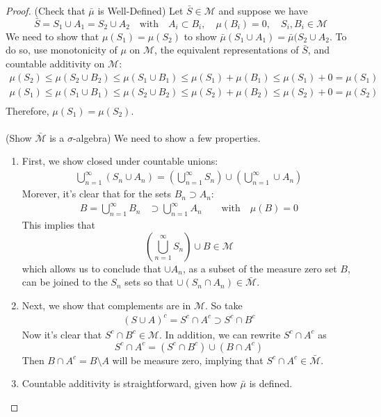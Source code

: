 \documentclass[12pt]{article}
\theoremstyle{plain}
\theoremstyle{definition}
\theoremstyle{remark}
\begin{document}
\begin{proof}
(Check that $\bar{\mu}$ is Well-Defined) Let $\bar{S}\in\mathscr{M}$ and suppose we have
\[
    \bar{S} = S_1 \cup A_1 = S_2 \cup A_2 
    \quad\text{with}\quad
    A_i \subset B_i, \quad \mu(B_i) = 0, 
    \quad S_i, B_i \in \mathscr{M}
\]
We need to show that $\mu(S_1) = \mu(S_2)$ to show $\bar{\mu}(S_1\cup
A_1) = \bar{\mu}(S_2\cup A_2$. To do so, use monotonicity of $\mu$ on
$\mathscr{M}$, the equivalent representations of $\bar{S}$, and
countable additivity on $\mathscr{M}$:
\begin{align*}
    \mu(S_2) \leq \mu(S_2 \cup B_2) \leq 
        \mu(S_1 \cup B_1) \leq \mu(S_1) + \mu(B_1)
        \leq \mu(S_1) + 0 = \mu(S_1)  \\
    \mu(S_1) \leq \mu(S_1 \cup B_1) \leq 
        \mu(S_2 \cup B_2) \leq \mu(S_2) + \mu(B_2)
        \leq \mu(S_2) + 0 = \mu(S_2)  \\
\end{align*}
Therefore, $\mu(S_1) = \mu(S_2)$.
\\
\\
(Show $\bar{\mathscr{M}}$ is a $\sigma$-algebra) We need to show a few properties.
\begin{enumerate}
\item
First, we show closed under countable unions:
\begin{align*}
    \bigcup^\infty_{n=1} (S_n\cup A_n) = 
    \left(\bigcup^\infty_{n=1} S_n\right)
    \cup \left(\bigcup^\infty_{n=1}\cup A_n\right)
\end{align*}
Morever, it's clear that for the sets $B_n \supset A_n$:
\begin{align*}
    B = \bigcup^\infty_{n=1} B_n &\supset 
    \bigcup^\infty_{n=1} A_n 
    \qquad \text{with} \quad \mu(B) = 0
\end{align*}
This implies that
\[
    \left(\bigcup^\infty_{n=1} S_n\right) \cup B \in 
    {\mathscr{M}} 
\]
which allows us to conclude that $\cup A_n$, as a subset of the measure
zero set $B$, can be joined to the $S_n$ sets so that $\cup (S_n \cap
A_n)\in\bar{\mathscr{M}}$.

\item
Next, we show that complements are in $\mathscr{M}$. So take
\begin{align*}
    (S\cup A)^c = S^c \cap A^c \supset S^c \cap B^c
\end{align*}
Now it's clear that $S^c \cap B^c\in \mathscr{M}$. In addition, we can
rewrite $S^c\cap A^c$ as
\[
    S^c\cap A^c = (S^c \cap B^c) \cup (B\cap A^c)
\]
Then $B \cap A^c = B\setminus A$ will be measure zero, implying that
$S^c \cap A^c\in \bar{\mathscr{M}}$.

\item Countable additivity is straightforward, given how $\bar{\mu}$ is defined.
\end{enumerate}
\end{proof}
\end{document}
